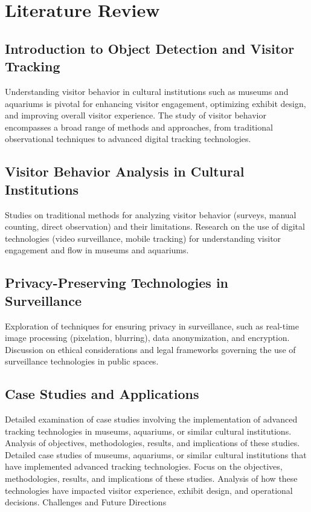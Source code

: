 \section{Literature Review}

\subsection{Introduction to Object Detection and Visitor Tracking}
Understanding visitor behavior in cultural institutions such as museums and aquariums is pivotal for enhancing visitor engagement, optimizing exhibit design, and improving overall visitor experience. The study of visitor behavior encompasses a broad range of methods and approaches, from traditional observational techniques to advanced digital tracking technologies.

\subsection{Visitor Behavior Analysis in Cultural Institutions}
Studies on traditional methods for analyzing visitor behavior (surveys, manual counting, direct observation) and their limitations.
Research on the use of digital technologies (video surveillance, mobile tracking) for understanding visitor engagement and flow in museums and aquariums.

\subsection{Privacy-Preserving Technologies in Surveillance}
Exploration of techniques for ensuring privacy in surveillance, such as real-time image processing (pixelation, blurring), data anonymization, and encryption.
Discussion on ethical considerations and legal frameworks governing the use of surveillance technologies in public spaces.

\subsection{Case Studies and Applications}
Detailed examination of case studies involving the implementation of advanced tracking technologies in museums, aquariums, or similar cultural institutions. Analysis of objectives, methodologies, results, and implications of these studies.
Detailed case studies of museums, aquariums, or similar cultural institutions that have implemented advanced tracking technologies.
Focus on the objectives, methodologies, results, and implications of these studies.
Analysis of how these technologies have impacted visitor experience, exhibit design, and operational decisions.
Challenges and Future Directions

